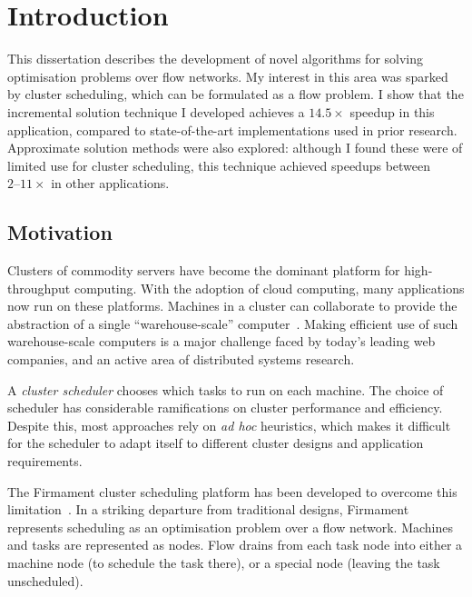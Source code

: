 \chapter{Introduction} \label{chap:intro}


This dissertation describes the development of novel algorithms for solving optimisation problems over flow networks. My interest in this area was sparked by cluster scheduling, which can be formulated as a flow problem. I show that the incremental solution technique I developed achieves a $14.5\times$ speedup in this application, compared to state-of-the-art implementations used in prior research. Approximate solution methods were also explored: although I found these were of limited use for cluster scheduling, this technique achieved speedups between $2\text{--}11\times$ in other applications.

\section{Motivation} \label{sec:intro-motivation}
Clusters of commodity servers have become the dominant platform for high-throughput computing. With the adoption of cloud computing, many applications now run on these platforms. Machines in a cluster can collaborate to provide the abstraction of a single ``warehouse-scale'' computer~\cite{WarehouseScale:2009}. Making efficient use of such warehouse-scale computers is a major challenge faced by today's leading web companies, and an active area of distributed systems research.

A \emph{cluster scheduler} chooses which tasks to run on each machine. The choice of scheduler has considerable ramifications on cluster performance and efficiency. Despite this, most approaches rely on \emph{ad hoc} heuristics, which makes it difficult for the scheduler to adapt itself to different cluster designs and application requirements.

The Firmament cluster scheduling platform has been developed to overcome this limitation\footnotemark~\cite[ch.~5]{Schwarzkopf:2015}. In a striking departure from traditional designs, Firmament represents scheduling as an optimisation problem over a flow network. Machines and tasks are represented as nodes. Flow drains from each task node into either a machine node (to schedule the task there), or a special node (leaving the task unscheduled).

